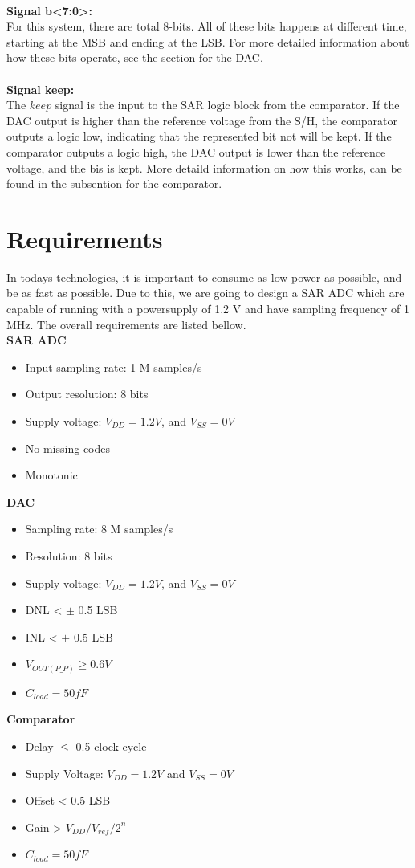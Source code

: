 \documentclass[english, 12pt, a4paper]{ifimaster}
\begin{document}
\\
\textbf{Signal b<7:0>:}\\
For this system, there are total 8-bits. All of these bits happens at different time, starting at the MSB and ending at the LSB. For more detailed information about how these bits operate, see
the section for the DAC.\\
\\
\textbf{Signal keep:}\\
The \(keep\) signal is the input to the SAR logic block from the comparator. If the DAC output is higher than the reference voltage from the S/H, the comparator outputs a logic low, indicating
that the represented bit not will be kept. If the comparator outputs a logic high, the DAC output is lower than the reference voltage, and the bis is kept. More detaild information on how this works, 
can be found in the subsention for the comparator.  



\section{Requirements}
In todays technologies, it is important to consume as low power as possible, and be as fast as possible. Due to this, we are going to design a SAR ADC which are capable 
of running with a powersupply of 1.2 V and have sampling frequency of 1 MHz. The overall requirements are listed bellow.\\
\textbf{SAR ADC}
\begin{itemize}
 \item Input sampling rate: 1 M samples/s
 \item Output resolution: 8 bits
 \item Supply voltage: \(V_{DD} = 1.2 V\), and \(V_{SS} = 0 V\)
 \item No missing codes
 \item Monotonic
\end{itemize}
\textbf{DAC}
\begin{itemize}
 \item Sampling rate: 8 M samples/s
 \item Resolution: 8 bits
 \item Supply voltage: \(V_{DD} = 1.2 V\), and \(V_{SS} = 0 V\)
 \item DNL < \(\pm\) 0.5 LSB
 \item INL < \(\pm\) 0.5 LSB
 \item \(V_{OUT(P\_P)} \geq 0.6 V\)
 \item \(C_{load} = 50 fF\)
\end{itemize}
\textbf{Comparator}
\begin{itemize}
 \item Delay \(\leq\) 0.5 clock cycle
 \item Supply Voltage: \(V_{DD} = 1.2V\) and \(V_{SS} = 0V\) 
 \item Offset < 0.5 LSB
 \item Gain > \(V_{DD}/V_{ref}/2^{n}\)
 \item \(C_{load} = 50 fF\)
\end{itemize}
\end{document}
